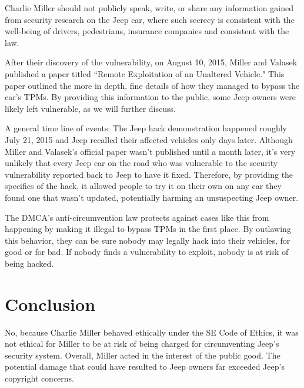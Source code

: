 \documentclass[12pt]{article}
\begin{document}
\begin{multicols}{2}
Charlie Miller should not publicly speak, write, or share any information gained from security research on the Jeep car, where such secrecy is consistent with the well-being of drivers, pedestrians, insurance companies and consistent with the law.

After their discovery of the vulnerability, on August 10, 2015, Miller and Valasek published a paper titled ``Remote Exploitation of an Unaltered Vehicle."\cite{officialPaper} This paper outlined the more in depth, fine details of how they managed to bypass the car's TPMs. By providing this information to the public, some Jeep owners were likely left vulnerable, as we will further discuss.


A general time line of events: The Jeep hack demonstration happened roughly July 21, 2015\cite{wired} and Jeep recalled their affected vehicles only days later.\cite{recall} Although Miller and Valasek's official paper wasn't published until a month later, it's very unlikely that every Jeep car on the road who was vulnerable to the security vulnerability reported back to Jeep to have it fixed. Therefore, by providing the specifics of the hack, it allowed people to try it on their own on any car they found one that wasn't updated, potentially harming an unsuspecting Jeep owner. 

The DMCA's anti-circumvention law protects against cases like this from happening by making it illegal to bypass TPMs in the first place.\cite{DMCA} By outlawing this behavior, they can be sure nobody may legally hack into their vehicles, for good or for bad. If nobody finds a vulnerability to exploit, nobody is at risk of being hacked.


\section{Conclusion}

No, because Charlie Miller behaved ethically under the SE Code of Ethics, it was not ethical for Miller to be at risk of being charged for circumventing Jeep's security system. Overall, Miller acted in the interest of the public good. The potential damage that could have resulted to Jeep owners far exceeded Jeep's copyright concerns.

\end{multicols}

\nocite{*}



\newpage

\end{document}
